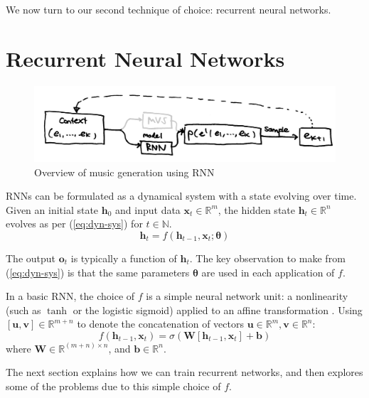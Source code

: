 \documentclass[12pt,a4paper,twoside,openright]{report}
\newcommand{\vect}[1]{\boldsymbol{\mathbf{#1}}}
\begin{document}
\vspace{8mm}

We now turn to our second technique of choice: recurrent neural networks.

\section{Recurrent Neural Networks}\label{sec:rnn-intro}

\begin{figure}[H]
\centering
\includegraphics[width=400pt]{figs/high_level_rnn_tmp.jpg}
\caption{Overview of music generation using RNN}
\label{fig:rnn-gen-overview}
\end{figure}

RNNs can be formulated as a dynamical system with a state evolving over time.
Given an initial state $\vect{h}_0$ and input data $\vect{x}_t \in
\mathbb{R}^m$, the hidden state $\vect{h}_t \in \mathbb{R}^n$ evolves as per
(\ref{eq:dyn-sys}) for $t \in \mathbb{N}$.
\begin{equation}
  \vect{h}_t = f(\vect{h}_{t-1}, \vect{x}_t; \vect{\theta})
  \label{eq:dyn-sys}
\end{equation} 

The output $\vect{o}_t$ is typically a function of $\vect{h}_t$. The key
observation to make from (\ref{eq:dyn-sys}) is that the same parameters
$\vect{\theta}$ are used in each application of $f$. 

In a basic RNN, the choice of $f$ is a simple neural network unit: a
nonlinearity (such as $\tanh$ or the logistic sigmoid) applied to an affine
transformation \cite{zaremba2014recurrent}. Using
$[\vect{u},\vect{v}] \in \mathbb{R}^{m+n}$ to denote the concatenation of
vectors $\vect{u} \in \mathbb{R}^m, \vect{v} \in \mathbb{R}^n$: 
$$f(\vect{h}_{t-1}, \vect{x}_t) = \sigma(\vect{W}[\vect{h}_{t-1}, 
\vect{x}_t] + \vect{b})$$ 
where $\vect{W} \in \mathbb{R}^{(m+n) \times n}$, and $\vect{b} \in
\mathbb{R}^n$. 

The next section explains how we can train recurrent networks, and then explores
some of the problems due to this simple choice of $f$.
\end{document}
